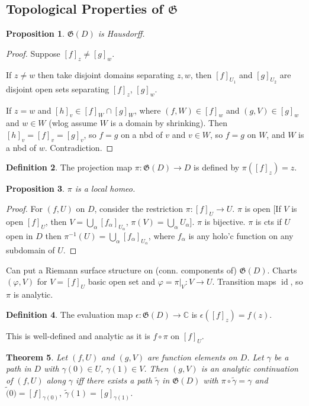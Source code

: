 \documentclass{article}
\theoremstyle{definition}
\newtheorem{defn}{Definition}[section]
\theoremstyle{remark}
\theoremstyle{plain}
\newtheorem{thm}[defn]{Theorem}
\newtheorem{prop}[defn]{Proposition}
\newcommand{\CC}{\mathbb{C}}
\newcommand{\id}{\operatorname{id}}
\begin{document}
\subsection{Topological Properties of $\mathfrak G$}
\begin{prop}
    $\mathfrak G(D)$ is Hausdorff.
\end{prop}
\begin{proof}
    Suppose $[f]_z\neq [g]_w$.

    
    If $z\neq w$ then take disjoint domains separating $z,w$, then $[f]_{U_1}$ and $[g]_{U_2}$ are disjoint open sets separating $[f]_z$, $[g]_w$.

    If $z=w$ and $[h]_v\in[f]_W\cap [g]_W$, where $(f,W)\in [f]_w$ and $(g,V)\in [g]_w$ and $w\in W$ (wlog assume $W$ is a domain by shrinking). Then $[h]_v=[f]_v=[g]_v$, so $f=g$ on a nbd of $v$ and $v\in W$, so $f=g$ on $W$, and $W$ is a nbd of $w$. Contradiction. 
\end{proof}
\begin{defn}
     The projection map $\pi:\mathfrak G(D)\to D$ is defined by $\pi([f]_z)=z$.
\end{defn}
\begin{prop}
    $\pi$ is a local homeo.
\end{prop}
\begin{proof}
    For $(f,U)$ on $D$, consider the restriction $\pi:[f]_U\to U$. $\pi$ is open [If $V$ is open $[f]_U$, then $V=\bigcup_\alpha[f_\alpha]_{U_\alpha}$, $\pi(V)=\bigcup_\alpha U_\alpha$]. $\pi$ is bijective. $\pi$ is cts if $U$ open in $D$ then $\pi^{-1}(U)=\bigcup_{\alpha}[f_\alpha]_{U_\alpha}$, where $f_\alpha$ is any holo'c function on any subdomain of $U$.
\end{proof}
Can put a Riemann surface structure on (conn. components of) $\mathfrak G(D)$. Charts $(\varphi,V)$ for $V=[f]_U$ basic open set and $\varphi=\pi|_{V}:V\to U$. Transition maps $\id$, so $\pi$ is analytic.
\begin{defn}
    The evaluation map $\epsilon:\mathfrak G(D)\to\CC$ is $\epsilon([f]_z)=f(z)$.
\end{defn}
This is well-defined and analytic as it is $f\circ\pi$ on $[f]_U$.
\begin{thm}
    Let $(f,U)$ and $(g,V)$ are function elements on $D$. Let $\gamma$ be a path in $D$ with $\gamma(0)\in U$, $\gamma(1)\in V$. Then $(g,V)$ is an analytic continuation of $(f,U)$ along $\gamma$ iff there exists a path $\tilde\gamma$ in $\mathfrak G(D)$ with $\pi\circ\tilde\gamma=\gamma$ and $\tilde(0)=[f]_{\gamma(0)},\ \tilde\gamma(1)=[g]_{\gamma(1)}$.
\end{thm}
\end{document}
